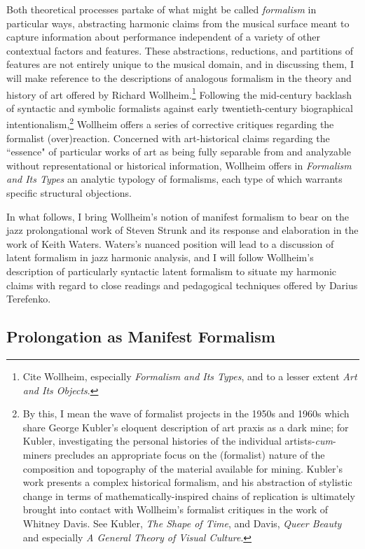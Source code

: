 Both theoretical processes partake of what might be called \emph{formalism} in particular ways, abstracting harmonic claims from the musical surface meant to capture information about performance independent of a variety of other contextual factors and features.  These abstractions, reductions, and partitions of features are not entirely unique to the musical domain, and in discussing them, I will make reference to the descriptions of analogous formalism in the theory and history of art offered by Richard Wollheim.\footnote{Cite Wollheim, especially \emph{Formalism and Its Types}, and to a lesser extent \emph{Art and Its Objects}.}  Following the mid-century backlash of syntactic and symbolic formalists against early twentieth-century biographical intentionalism,\footnote{By this, I mean the wave of formalist projects in the 1950s and 1960s which share George Kubler's eloquent description of art praxis as a dark mine; for Kubler, investigating the personal histories of the individual artists-\emph{cum}-miners precludes an appropriate focus on the (formalist) nature of the composition and topography of the material available for mining.  Kubler's work presents a complex historical formalism, and his abstraction of stylistic change in terms of mathematically-inspired chains of replication is ultimately brought into contact with Wollheim's formalist critiques in the work of Whitney Davis.  See Kubler, \emph{The Shape of Time}, and Davis, \emph{Queer Beauty} and especially \emph{A General Theory of Visual Culture}.}  Wollheim offers a series of corrective critiques regarding the formalist (over)reaction.  Concerned with art-historical claims regarding the ``essence" of particular works of art as being fully separable from and analyzable without representational or historical information, Wollheim offers in \emph{Formalism and Its Types} an analytic typology of formalisms, each type of which warrants specific structural objections.

In what follows, I bring Wollheim's notion of manifest formalism to bear on the jazz prolongational work of Steven Strunk and its response and elaboration in the work of Keith Waters.  Waters's nuanced position will lead to a discussion of latent formalism in jazz harmonic analysis, and I will follow Wollheim's description of particularly syntactic latent formalism to situate my harmonic claims with regard to close readings and pedagogical techniques offered by Darius Terefenko.

\subsection{Prolongation as Manifest Formalism}

